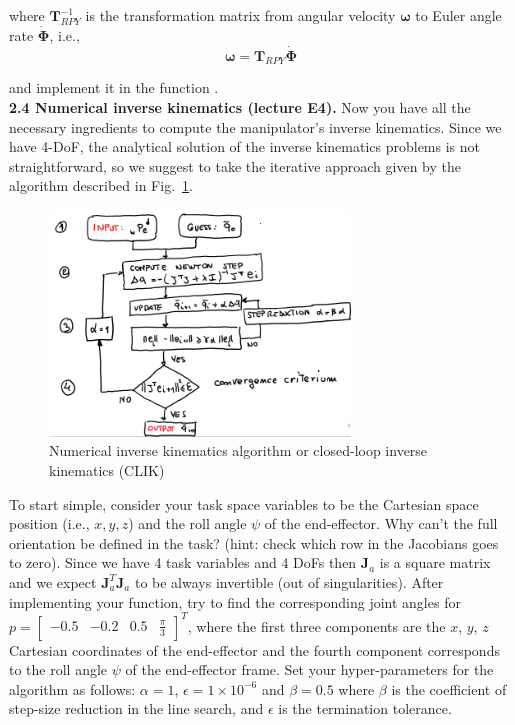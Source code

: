 \documentclass[11pt]{article}
\newcommand{\mat}[1]{\ensuremath{\begin{bmatrix}#1\end{bmatrix}}}	%
\begin{document}
where $\mathbf{T}_{RPY}^{-1}$ is the transformation matrix from angular velocity $\boldsymbol{\omega}$ to Euler angle rate $\dot{\mathbf{\Phi}}$, i.e.,
\begin{equation*}
	\boldsymbol{\omega} = \mathbf{T}_{RPY} \dot{\mathbf{\Phi}}
\end{equation*}

and implement it in the function .\\




\textbf{2.4 Numerical inverse kinematics (lecture E4).} Now you have all the necessary ingredients to compute the manipulator's inverse kinematics. Since we have 4-DoF, the analytical solution of the inverse kinematics problems is not straightforward, so we suggest to take the iterative approach given by the algorithm described in Fig.~\ref{fig:CLIK}.  
%
\begin{figure}[bht]
	\centering
	\includegraphics[width=8cm]{pics/flow_chart.png}
	\caption{Numerical inverse kinematics algorithm or closed-loop inverse kinematics (CLIK)}
	\label{fig:CLIK}
\end{figure}
%
To start simple, consider your task space variables to be the Cartesian space position (i.e., $x,y,z$) and the roll angle $\psi$ of the end-effector. 
Why can't the full orientation be defined in the task? (hint: check which row in the Jacobians goes to zero).
Since we have 4 task variables and 4 DoFs then   $\mathbf{J}_a$ is a square matrix and we expect $\mathbf{J}_a^T\mathbf{J}_a$ to be always invertible (out of singularities).  After implementing your function, try to find the corresponding joint angles for $p = \mat{-0.5 & -0.2 & 0.5 & \frac{\pi}{3}}^T$, where the first three components are the $x$, $y$, $z$ Cartesian coordinates of the end-effector and the fourth component corresponds to the roll angle $\psi$ of the end-effector frame. Set your hyper-parameters for the algorithm as follows: $\alpha = 1$, $\epsilon = 1 \times 10^{-6}$ and $\beta = 0.5$ where $\beta$ is the coefficient of step-size reduction in the line search, and $\epsilon$ is the termination tolerance. 
\end{document}
